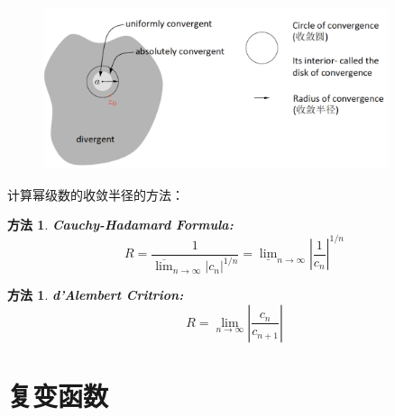 \documentclass[10pt, a4paper, oneside]{ctexbook}
\newtheorem{method}[theorem]{方法}
\begin{document}
\begin{figure}[h]
    \includegraphics[width=0.9\textwidth]{./assets/converge_radius.png}
\end{figure}
计算幂级数的收敛半径的方法：
\begin{method}
    {\rm \textbf{Cauchy-Hadamard Formula: }}
    \begin{equation*}
        R=\frac{1}{\overline{\lim }_{n \rightarrow \infty}\left|c_{n}\right|^{1 / n}}=\underline{\lim }_{n \rightarrow \infty}\left|\frac{1}{c_{n}}\right|^{1 / n}
    \end{equation*}
\end{method}
\begin{method}
    {\rm \textbf{d'Alembert Critrion: }}
    \begin{equation*}
        R=\lim _{n \rightarrow \infty}\left|\frac{c_{n}}{c_{n+1}}\right|
    \end{equation*}
\end{method}

\chapter{复变函数}
\end{document}
